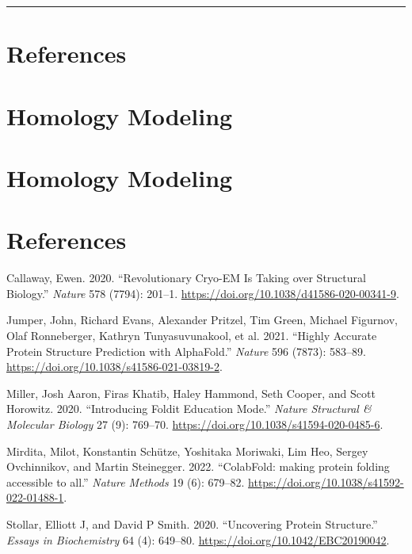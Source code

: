 \documentclass[
  letterpaper,
  DIV=11,
  numbers=noendperiod]{scrreprt}
\newlength{\cslhangindent}
\newlength{\cslentryspacingunit} %
\newenvironment{CSLReferences}[2] %
 {%
  \setlength{\parindent}{0pt}
  \ifodd #1
  \let\oldpar\par
  \def\par{\hangindent=\cslhangindent\oldpar}
  \fi
  \setlength{\parskip}{#2\cslentryspacingunit}
 }%
 {}
\begin{document}
\hfill\break

\begin{center}\rule{0.5\linewidth}{0.5pt}\end{center}

\hypertarget{references}{%
\chapter{References}\label{references}}

\hypertarget{homology-modeling}{%
\chapter{Homology Modeling}\label{homology-modeling}}

\hypertarget{homology-modeling-1}{%
\chapter{Homology Modeling}\label{homology-modeling-1}}

\hypertarget{references-1}{%
\chapter*{References}\label{references-1}}

\hypertarget{refs}{}
\begin{CSLReferences}{1}{0}
\leavevmode{}%
Callaway, Ewen. 2020. {``Revolutionary Cryo-EM Is Taking over Structural
Biology.''} \emph{Nature} 578 (7794): 201--1.
\url{https://doi.org/10.1038/d41586-020-00341-9}.

\leavevmode{}%
Jumper, John, Richard Evans, Alexander Pritzel, Tim Green, Michael
Figurnov, Olaf Ronneberger, Kathryn Tunyasuvunakool, et al. 2021.
{``Highly Accurate Protein Structure Prediction with AlphaFold.''}
\emph{Nature} 596 (7873): 583--89.
\url{https://doi.org/10.1038/s41586-021-03819-2}.

\leavevmode{}%
Miller, Josh Aaron, Firas Khatib, Haley Hammond, Seth Cooper, and Scott
Horowitz. 2020. {``Introducing Foldit Education Mode.''} \emph{Nature
Structural \& Molecular Biology} 27 (9): 769--70.
\url{https://doi.org/10.1038/s41594-020-0485-6}.

\leavevmode{}%
Mirdita, Milot, Konstantin Schütze, Yoshitaka Moriwaki, Lim Heo, Sergey
Ovchinnikov, and Martin Steinegger. 2022. {``ColabFold: making protein
folding accessible to all.''} \emph{Nature Methods} 19 (6): 679--82.
\url{https://doi.org/10.1038/s41592-022-01488-1}.

\leavevmode{}%
Stollar, Elliott J, and David P Smith. 2020. {``Uncovering Protein
Structure.''} \emph{Essays in Biochemistry} 64 (4): 649--80.
\url{https://doi.org/10.1042/EBC20190042}.

\end{CSLReferences}
\end{document}
